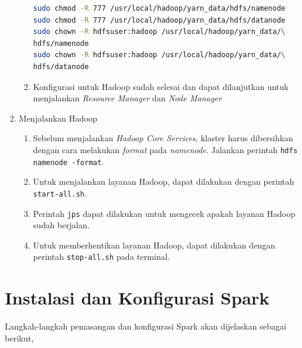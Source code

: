 \begin{enumerate}
\begin{enumerate}
\begin{lstlisting}[language=bash]
sudo chmod -R 777 /usr/local/hadoop/yarn_data/hdfs/namenode
sudo chmod -R 777 /usr/local/hadoop/yarn_data/hdfs/datanode
sudo chown -R hdfsuser:hadoop /usr/local/hadoop/yarn_data/\
hdfs/namenode
sudo chown -R hdfsuser:hadoop /usr/local/hadoop/yarn_data/\
hdfs/datanode
      \end{lstlisting}
    \item Konfigurasi untuk Hadoop sudah selesai dan dapat dilanjutkan untuk menjalankan \textit{Resource Manager} dan \textit{Node Manager}
  \end{enumerate}
  \item Menjalankan Hadoop
  \begin{enumerate}
    \item Sebelum menjalankan \textit{Hadoop Core Services}, klaster harus dibersihkan dengan cara melakukan \textit{format} pada \textit{namenode}. Jalankan perintah \verb|hdfs namenode -format|.
    \item Untuk menjalankan layanan Hadoop, dapat dilakukan dengan perintah \verb|start-all.sh|.
    \item Perintah \verb|jps| dapat dilakukan untuk mengecek apakah layanan Hadoop sudah berjalan.
    \item Untuk memberhentikan layanan Hadoop, dapat dilakukan dengan perintah \verb|stop-all.sh| pada terminal.
  \end{enumerate}
\end{enumerate}



\chapter{Instalasi dan Konfigurasi Spark}
\label{appendix:D}

Langkah-langkah pemasangan dan konfigurasi Spark akan dijelaskan sebagai berikut,

